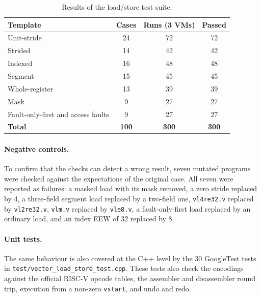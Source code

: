 \documentclass[11pt,a4paper]{article}
\begin{document}
\begin{table}[h]
\centering
\begin{tabular}{|l|c|c|c|}
    \hline
    \textbf{Template} & \textbf{Cases} & \textbf{Runs (3 VMs)} & \textbf{Passed} \\
    \hline
    Unit-stride                       & 24 & 72  & 72 \\
    Strided                           & 14 & 42  & 42 \\
    Indexed                           & 16 & 48  & 48 \\
    Segment                           & 15 & 45  & 45 \\
    Whole-register                    & 13 & 39  & 39 \\
    Mask                              & 9  & 27  & 27 \\
    Fault-only-first and access faults & 9 & 27  & 27 \\
    \hline
    \textbf{Total}                    & \textbf{100} & \textbf{300} & \textbf{300} \\
    \hline
\end{tabular}
\caption{Results of the load/store test suite.}
\label{tab:suite}
\end{table}

\paragraph{Negative controls.} To confirm that the checks can detect a wrong result, seven
mutated programs were checked against the expectations of the original case. All seven were
reported as failures: a masked load with its mask removed, a zero stride replaced by 4, a
three-field segment load replaced by a two-field one, \texttt{vl4re32.v} replaced by
\texttt{vl2re32.v}, \texttt{vlm.v} replaced by \texttt{vle8.v}, a fault-only-first load replaced by
an ordinary load, and an index EEW of 32 replaced by 8.

\paragraph{Unit tests.} The same behaviour is also covered at the C++ level by the 30 GoogleTest
tests in \texttt{test/vector\_load\_store\_test.cpp}. These tests also check the encodings
against the official RISC-V opcode tables, the assembler and disassembler round trip, execution
from a non-zero \texttt{vstart}, and undo and redo.

\end{document}
